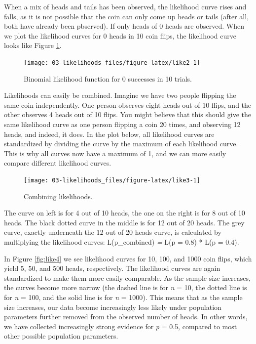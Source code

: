 \documentclass[
  oneside]{book}
\begin{document}
When a mix of heads and tails has been observed, the likelihood curve rises and falls, as it is not possible that the coin can only come up heads or tails (after all, both have already been pbserved). If only heads of 0 heads are observed. When we plot the likelihood curves for 0 heads in 10 coin flips, the likelihood curve looks like Figure \ref{fig:like2}.

\begin{figure}

{\centering \texttt{[image: 03-likelihoods\_files/figure-latex/like2-1]} 

}

\caption{Binomial likelihood function for 0 successes in 10 trials.}\label{fig:like2}
\end{figure}

Likelihoods can easily be combined. Imagine we have two people flipping the same coin independently. One person observes eight heads out of 10 flips, and the other observes 4 heads out of 10 flips. You might believe that this should give the same likelihood curve as one person flipping a coin 20 times, and observing 12 heads, and indeed, it does. In the plot below, all likelihood curves are standardized by dividing the curve by the maximum of each likelihood curve. This is why all curves now have a maximum of 1, and we can more easily compare different likelihood curves.

\begin{figure}

{\centering \texttt{[image: 03-likelihoods\_files/figure-latex/like3-1]} 

}

\caption{Combining likelihoods.}\label{fig:like3}
\end{figure}

The curve on left is for 4 out of 10 heads, the one on the right is for 8 out of 10 heads. The black dotted curve in the middle is for 12 out of 20 heads. The grey curve, exactly underneath the 12 out of 20 heads curve, is calculated by multiplying the likelihood curves: L(p\_combined) \emph{=} L(p = 0.8) * L(p = 0.4).

In Figure \ref{fig:like4} we see likelihood curves for 10, 100, and 1000 coin flips, which yield 5, 50, and 500 heads, respectively. The likelihood curves are again standardized to make them more easily comparable. As the sample size increases, the curves become more narrow (the dashed line is for \emph{n} = 10, the dotted line is for \emph{n} = 100, and the solid line is for \emph{n} = 1000). This means that as the sample size increases, our data become increasingly less likely under population parameters further removed from the observed number of heads. In other words, we have collected increasingly strong evidence for \emph{p} = 0.5, compared to most other possible population parameters.
\end{document}
